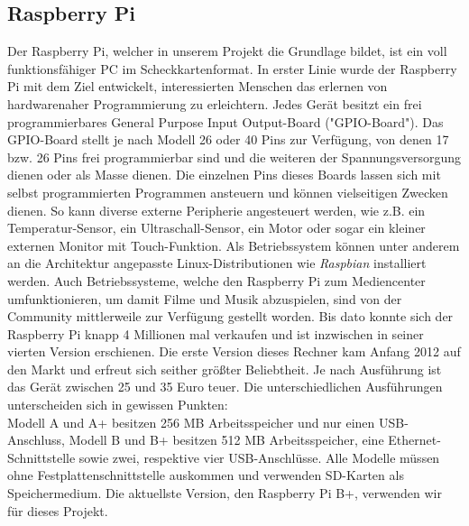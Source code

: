 \documentclass[journal]{IEEEtran}
\begin{document}
\subsection{Raspberry Pi}
Der Raspberry Pi, welcher in unserem Projekt die Grundlage bildet, ist ein voll funktionsfähiger PC im Scheckkartenformat. In erster Linie wurde der Raspberry Pi mit dem Ziel entwickelt, interessierten Menschen das erlernen von hardwarenaher Programmierung zu erleichtern. Jedes Gerät besitzt ein frei programmierbares General Purpose Input Output-Board ("GPIO-Board"). Das GPIO-Board stellt je nach Modell 26 oder 40 Pins zur Verfügung, von denen 17 bzw. 26 Pins frei programmierbar sind und die weiteren der Spannungsversorgung dienen oder als Masse dienen. Die einzelnen Pins dieses Boards lassen sich mit selbst programmierten Programmen ansteuern und können vielseitigen Zwecken dienen. So kann diverse externe Peripherie angesteuert werden, wie z.B. ein Temperatur-Sensor, ein Ultraschall-Sensor, ein Motor oder sogar ein kleiner externen Monitor mit Touch-Funktion. Als Betriebssystem können unter anderem an die Architektur angepasste Linux-Distributionen wie \textit{Raspbian} installiert werden.  Auch Betriebssysteme, welche den Raspberry Pi zum Mediencenter umfunktionieren, um damit Filme und Musik abzuspielen, sind von der Community mittlerweile zur Verfügung gestellt worden. Bis dato konnte sich der Raspberry Pi knapp 4 Millionen mal verkaufen und ist inzwischen in seiner vierten Version erschienen. \cite{verkaufszahlen} Die erste Version dieses Rechner kam Anfang 2012 auf den Markt und erfreut sich seither größter Beliebtheit. Je nach Ausführung ist das Gerät zwischen 25 und 35 Euro teuer. Die unterschiedlichen Ausführungen unterscheiden sich in gewissen Punkten: \\ Modell A und A+ besitzen 256 MB Arbeitsspeicher und nur einen USB-Anschluss, Modell B und B+ besitzen 512 MB Arbeitsspeicher, eine Ethernet-Schnittstelle sowie zwei, respektive vier USB-Anschlüsse. Alle Modelle müssen ohne Festplattenschnittstelle auskommen und verwenden SD-Karten als Speichermedium. Die aktuellste Version, den Raspberry Pi B+, verwenden wir für dieses Projekt.\\
\end{document}

